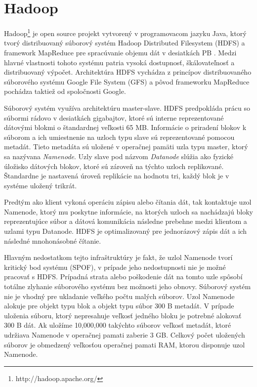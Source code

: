 \documentclass[11pt,twoside,a4paper]{book}
\begin{document}
\section*{Hadoop}

Hadoop\footnote{http://hadoop.apache.org/} je open source projekt vytvorený v programovacom jazyku Java, ktorý tvorý distribuovaný súborový systém Hadoop Distributed Filesystem (HDFS) a framework MapReduce pre spracúvanie objemu dát v desiatkách PB \cite{Thusoo:2010:DWA:1807167.1807278}. Medzi hlavné vlastnosti tohoto systému patria vysoká dostupnosť, škálovateľnosť a distribuovaný výpočet. Architektúra HDFS vychádza z princípov distribuovaného súborového systému Google File System \cite{Ghemawat:2003:GFS:945445.945450} (GFS) a pôvod frameworku MapReduce \cite{Dean:2008:MSD:1327452.1327492} pochádza taktiež od spoločnosti Google.

 


Súborový systém využíva architektúru master-slave. HDFS predpokláda prácu so súbormi rádovo v desiatkách gigabajtov, ktoré sú interne reprezentované dátovými blokmi o štandardnej veľkosti 65 MB. Informácie o priradení blokov k súborom a ich umiestnenie na uzloch typu slave sú reprezentované pomocou metadát. Tieto metadáta sú uložené v operačnej pamäti uzla typu master, ktorý sa nazývana \emph{Namenode}. Uzly slave pod názvom \emph{Datanode} slúžia ako fyzické úložisko dátových blokov, ktoré sú zároveň na týchto uzloch replikované. Štandardne je nastavená úroveň replikácie na hodnotu tri,
každý blok je v systéme uložený trikrát.

Predtým ako klient vykoná operáciu zápisu alebo čítania dát, tak kontaktuje uzol Namenode, ktorý mu poskytne informácie, na ktorých uzloch sa nachádzajú bloky reprezentujúce súbor a dátová komunikácia následne prebehne medzi klientom a uzlami typu Datanode. HDFS je optimalizovaný pre jednorázový zápis dát a ich následné mnohonásobné čítanie.


Hlavným nedostatkom tejto infraštruktúry je fakt, že uzlol Namenode tvorí kritický bod systému (SPOF), v prípade jeho nedostupnosti nie je možné pracovať s HDFS. Prípadná strata alebo poškodenie dát na tomto uzle spôsobí totálne zlyhanie súborového systému bez možnosti jeho obnovy. Súborový systém nie je vhodný pre ukladanie veľkého počtu malých súborov.
Uzol Namenode alokuje pre objekt typu blok a objekt typu súbor 300 B metadát. V prípade uloženia súboru, ktorý nepresahuje veľkosť jedného bloku je potrebné alokovať 300 B dát. Ak uložíme 10,000,000 takýchto súborov veľkosť metadát, ktoré udržiava Namenode v operačnej pamati zaberie 3 GB. Celkový počet uložených súborov je obmedzený veľkosťou operačnej pamati RAM, ktorou disponuje uzol Namenode.
\end{document}
